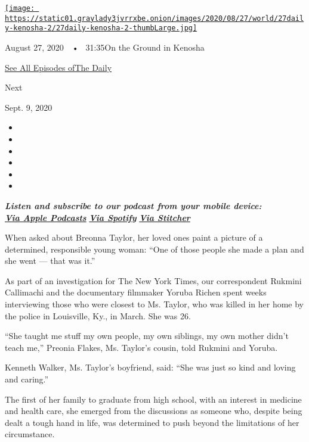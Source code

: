 \href{https://www.nytimes3xbfgragh.onion/2020/08/27/podcasts/the-daily/kenosha-wisconsin-protests.html?action=click\&module=audio-series-bar\&region=header\&pgtype=Article}{\texttt{[image: https://static01.graylady3jvrrxbe.onion/images/2020/08/27/world/27daily-kenosha-2/27daily-kenosha-2-thumbLarge.jpg]}}

August 27, 2020~~•~ 31:35On the Ground in Kenosha

\href{https://www.nytimes3xbfgragh.onion/column/the-daily}{See All
Episodes ofThe Daily}

Next

Sept. 9, 2020

\begin{itemize}
\item
\item
\item
\item
\item
\item
\end{itemize}

\emph{\textbf{Listen and subscribe to our podcast from your mobile
device:}}\\
\textbf{\href{https://itunes.apple.com/us/podcast/the-daily/id1200361736?mt=2}{\emph{Via
Apple Podcasts}}} \emph{\textbf{\textbar{}}}
\textbf{\href{https://open.spotify.com/show/3IM0lmZxpFAY7CwMuv9H4g?si=SfuMSC55R1qprFsRZU3_zw}{\emph{Via
Spotify}}} \emph{\textbf{\textbar{}}}
\textbf{\href{http://www.stitcher.com/podcast/the-new-york-times/the-daily-10}{\emph{Via
Stitcher}}}

When asked about Breonna Taylor, her loved ones paint a picture of a
determined, responsible young woman: ``One of those people she made a
plan and she went --- that was it.''

As part of an investigation for The New York Times, our correspondent
Rukmini Callimachi and the documentary filmmaker Yoruba Richen spent
weeks interviewing those who were closest to Ms. Taylor, who was killed
in her home by the police in Louisville, Ky., in March. She was 26.

``She taught me stuff my own people, my own siblings, my own mother
didn't teach me,'' Preonia Flakes, Ms. Taylor's cousin, told Rukmini and
Yoruba.

Kenneth Walker, Ms. Taylor's boyfriend, said: ``She was just so kind and
loving and caring.''

The first of her family to graduate from high school, with an interest
in medicine and health care, she emerged from the discussions as someone
who, despite being dealt a tough hand in life, was determined to push
beyond the limitations of her circumstance.

